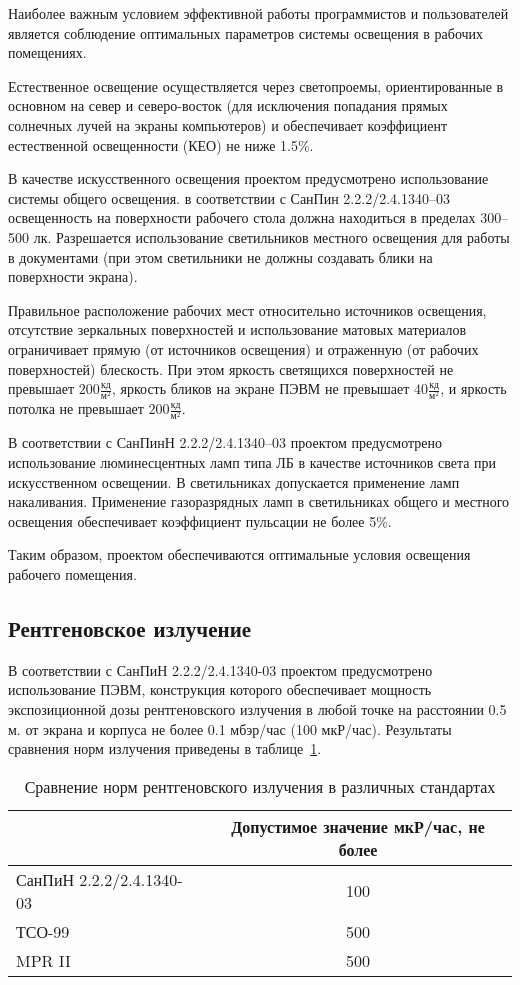 Наиболее важным условием эффективной работы программистов и пользователей является соблюдение оптимальных параметров системы освещения в рабочих помещениях.

Естественное освещение осуществляется через светопроемы, ориентированные в основном на север и северо-восток (для исключения попадания прямых солнечных лучей на экраны компьютеров) и обеспечивает коэффициент естественной освещенности (КЕО) не ниже 1.5\%.

В качестве искусственного освещения проектом предусмотрено использование системы общего освещения. в соответствии с СанПин 2.2.2/2.4.1340--03 освещенность на поверхности рабочего стола должна находиться в пределах 300--500 лк. Разрешается использование светильников местного освещения для работы в документами (при этом светильники не должны создавать блики на поверхности экрана).

Правильное расположение рабочих мест относительно источников освещения, отсутствие зеркальных поверхностей и использование матовых материалов ограничивает прямую (от источников освещения) и отраженную (от рабочих поверхностей) блескость. При  этом яркость светящихся поверхностей не превышает $200 \frac{\text{кд}}{\text{м}^2}$, яркость бликов на экране ПЭВМ не превышает $40 \frac{\text{кд}}{\text{м}^2}$, и яркость потолка не превышает $200 \frac{\text{кд}}{\text{м}^2}$.

В соответствии с СанПинН 2.2.2/2.4.1340--03 проектом предусмотрено использование люминесцентных ламп типа ЛБ в качестве источников света при искусственном освещении. В светильниках допускается применение ламп накаливания. Применение газоразрядных ламп в светильниках общего и местного освещения обеспечивает коэффициент пульсации не более 5\%.

Таким образом, проектом обеспечиваются оптимальные условия освещения рабочего помещения.

\subsection{Рентгеновское излучение}

В соответствии с СанПиН 2.2.2/2.4.1340-03 проектом предусмотрено использование ПЭВМ, конструкция которого обеспечивает мощность экспозиционной дозы рентгеновского излучения в любой точке на расстоянии 0.5 м. от экрана и корпуса не более 0.1 мбэр/час (100 мкР/час). Результаты сравнения норм излучения приведены в таблице~\ref{tab:rentgen}.

\begin{table}[ht]
\caption{Сравнение норм рентгеновского излучения в различных стандартах}
\begin{tabular}{|l|c|}
\hline
& Допустимое значение мкР/час, не более \\
\hline
СанПиН 2.2.2/2.4.1340-03 & 100 \\
\hline
ТСО-99 & 500 \\
\hline
MPR II & 500\\
\hline
\end{tabular}
\label{tab:rentgen}
\end{table}

